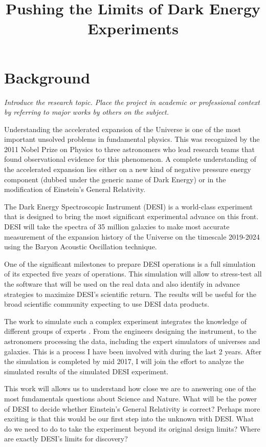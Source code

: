 \documentclass[12pt]{article}
\title{Pushing the Limits of Dark Energy Experiments}
\begin{document}
\maketitle
\section*{Background}
\textit{Introduce the research topic. Place the project in academic or
professional context by referring to major works by others on the
subject. }

Understanding the accelerated expansion of the Universe is one of the
most important unsolved problems in fundamental physics.  
This was recognized by the 2011 Nobel Prize on Physics to three
astronomers who lead research teams that found observational evidence for
this phenomenon.  A complete understanding of the accelerated
expansion lies either on a new kind of negative pressure energy
component (dubbed under the generic name of Dark Energy) or in the
modification of Einstein's General Relativity. 

The Dark Energy Spectroscopic Instrument (DESI) is a world-class
experiment that is designed to bring the most significant experimental
advance on this front. 
DESI will take the spectra of 35 million galaxies to make most
accurate measurement of the expansion history of the Universe on the
timescale 2019-2024 using the Baryon Acoustic Oscillation technique.  

One of the significant milestones to prepare DESI operations is a
full simulation of its expected five years of operations.
This simulation will allow to stress-test all the software that will
be used on the real data and also identify in advance strategies to
maximize DESI's scientific return.  
The results will be useful for the broad scientific community
expecting to use DESI data products.

The work to simulate such a complex experiment integrates the knowledge of
different groups of experts \cite{2016A&C....15....1N}. From the
engineers designing   the instrument, to the astronomers processing
the data, including the expert simulators of universes and
galaxies. This is a process I have been involved with during the last
2 years.
After the simulation is completed by mid 2017, I will join the effort
to analyze the simulated results of the simulated DESI experiment.

 
This work will allows us to understand how close we are to answering
one of the most fundamentals questions about Science and Nature. What
will be the power of DESI to decide whether Einstein's General
Relativity is correct?  
Perhaps more exciting is that this would be our first step into the
unknown with DESI. What do we need to do to take the experiment beyond its
original design limits? Where are exactly DESI's limits for discovery?
\end{document}

